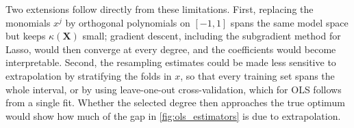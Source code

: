 Two extensions follow directly from these limitations. First, replacing the
monomials $x^j$ by orthogonal polynomials on $[-1,1]$ spans the same model
space but keeps $\kappa(\bm{X})$ small; gradient descent, including the
subgradient method for Lasso, would then converge at every degree, and the
coefficients would become interpretable. Second, the resampling estimates
could be made less sensitive to extrapolation by stratifying the folds in $x$,
so that every training set spans the whole interval, or by using leave-one-out
cross-validation, which for OLS follows from a single fit. Whether the selected
degree then approaches the true optimum would show how much of the gap in
\cref{fig:ols_estimators} is due to extrapolation.
